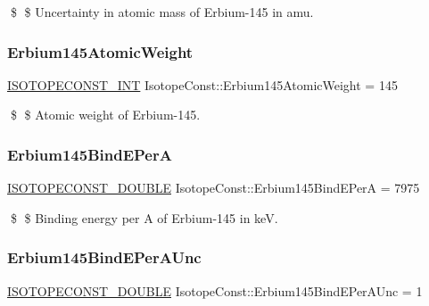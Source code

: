 \$ \$ Uncertainty in atomic mass of Erbium-\/145 in amu. \mbox{\label{group___isotope_const-_erbium-_er145_gad06c3b377ec1e079624b58a465ea09ff}} 
\subsubsection{\texorpdfstring{Erbium145\+Atomic\+Weight}{Erbium145AtomicWeight}}
{\footnotesize\ttfamily \mbox{\hyperlink{group___isotope_const-_macros_ga5f18360b3e99483a35c32d789e62621c}{I\+S\+O\+T\+O\+P\+E\+C\+O\+N\+S\+T\+\_\+\+I\+NT}} Isotope\+Const\+::\+Erbium145\+Atomic\+Weight = 145}

\$ \$ Atomic weight of Erbium-\/145. \mbox{\label{group___isotope_const-_erbium-_er145_ga4eb8ce0abb9998b825ac9af99b6a0fb6}} 
\subsubsection{\texorpdfstring{Erbium145\+Bind\+E\+PerA}{Erbium145BindEPerA}}
{\footnotesize\ttfamily \mbox{\hyperlink{group___isotope_const-_macros_ga8f45a7272ce02c0b4c65c44636ed719a}{I\+S\+O\+T\+O\+P\+E\+C\+O\+N\+S\+T\+\_\+\+D\+O\+U\+B\+LE}} Isotope\+Const\+::\+Erbium145\+Bind\+E\+PerA = 7975}

\$ \$ Binding energy per A of Erbium-\/145 in keV. \mbox{\label{group___isotope_const-_erbium-_er145_gaa33c78034cb854957d6f4236fce454e1}} 
\subsubsection{\texorpdfstring{Erbium145\+Bind\+E\+Per\+A\+Unc}{Erbium145BindEPerAUnc}}
{\footnotesize\ttfamily \mbox{\hyperlink{group___isotope_const-_macros_ga8f45a7272ce02c0b4c65c44636ed719a}{I\+S\+O\+T\+O\+P\+E\+C\+O\+N\+S\+T\+\_\+\+D\+O\+U\+B\+LE}} Isotope\+Const\+::\+Erbium145\+Bind\+E\+Per\+A\+Unc = 1}

